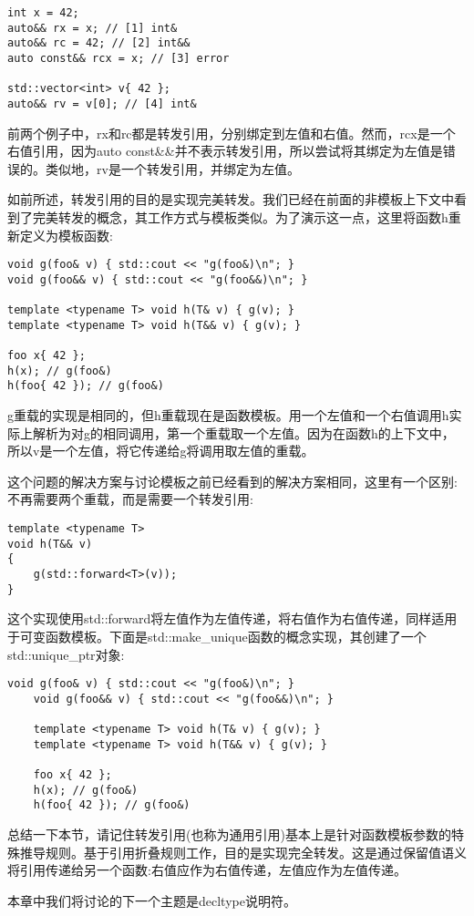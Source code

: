 \begin{lstlisting}[style=styleCXX]
int x = 42;
auto&& rx = x; // [1] int&
auto&& rc = 42; // [2] int&&
auto const&& rcx = x; // [3] error

std::vector<int> v{ 42 };
auto&& rv = v[0]; // [4] int&
\end{lstlisting}

前两个例子中，rx和rc都是转发引用，分别绑定到左值和右值。然而，rcx是一个右值引用，因为auto const\&\&并不表示转发引用，所以尝试将其绑定为左值是错误的。类似地，rv是一个转发引用，并绑定为左值。

如前所述，转发引用的目的是实现完美转发。我们已经在前面的非模板上下文中看到了完美转发的概念，其工作方式与模板类似。为了演示这一点，这里将函数h重新定义为模板函数:

\begin{lstlisting}[style=styleCXX]
void g(foo& v) { std::cout << "g(foo&)\n"; }
void g(foo&& v) { std::cout << "g(foo&&)\n"; }

template <typename T> void h(T& v) { g(v); }
template <typename T> void h(T&& v) { g(v); }

foo x{ 42 };
h(x); // g(foo&)
h(foo{ 42 }); // g(foo&)
\end{lstlisting}

g重载的实现是相同的，但h重载现在是函数模板。用一个左值和一个右值调用h实际上解析为对g的相同调用，第一个重载取一个左值。因为在函数h的上下文中，所以v是一个左值，将它传递给g将调用取左值的重载。

这个问题的解决方案与讨论模板之前已经看到的解决方案相同，这里有一个区别:不再需要两个重载，而是需要一个转发引用:

\begin{lstlisting}[style=styleCXX]
template <typename T>
void h(T&& v)
{
	g(std::forward<T>(v));
}
\end{lstlisting}

这个实现使用std::forward将左值作为左值传递，将右值作为右值传递，同样适用于可变函数模板。下面是std::make\_unique函数的概念实现，其创建了一个std::unique\_ptr对象:

\begin{lstlisting}[style=styleCXX]
	void g(foo& v) { std::cout << "g(foo&)\n"; }
	void g(foo&& v) { std::cout << "g(foo&&)\n"; }
	
	template <typename T> void h(T& v) { g(v); }
	template <typename T> void h(T&& v) { g(v); }
	
	foo x{ 42 };
	h(x); // g(foo&)
	h(foo{ 42 }); // g(foo&)
\end{lstlisting}

总结一下本节，请记住转发引用(也称为通用引用)基本上是针对函数模板参数的特殊推导规则。基于引用折叠规则工作，目的是实现完全转发。这是通过保留值语义将引用传递给另一个函数:右值应作为右值传递，左值应作为左值传递。

本章中我们将讨论的下一个主题是decltype说明符。













